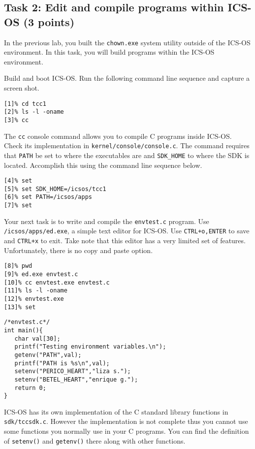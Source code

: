 \documentclass[a4paper, 11pt,oneside]{article}
\begin{document}
\subsection*{Task 2: Edit and compile programs within ICS-OS (3 points)}
In the previous lab, you built the \texttt{chown.exe} system utility outside 
of the ICS-OS environment. In this task, you will build programs within the 
ICS-OS environment.

Build and boot ICS-OS. Run the following command line sequence and capture a screen shot.	

\begin{verbatim}
[1]% cd tcc1
[2]% ls -l -oname
[3]% cc
\end{verbatim}

The \texttt{cc} console command allows you to compile C programs inside ICS-OS. Check its implementation 
in \texttt{kernel/console/console.c}. The command requires that \texttt{PATH} be set to where 
the executables are and \texttt{SDK\_HOME} to where the SDK is located. Accomplish this using the command line sequence below.  

\begin{verbatim}
[4]% set
[5]% set SDK_HOME=/icsos/tcc1
[6]% set PATH=/icsos/apps
[7]% set
\end{verbatim}

Your next task is to write and compile the \texttt{envtest.c} program. Use \texttt{/icsos/apps/ed.exe}, a simple text editor for ICS-OS. Use \texttt{CTRL+o,ENTER} to save and \texttt{CTRL+x} to exit. Take note that this editor has a very limited set of features. Unfortunately, there is no copy and paste option.

\begin{verbatim}
[8]% pwd
[9]% ed.exe envtest.c  
[10]% cc envtest.exe envtest.c
[11]% ls -l -oname
[12]% envtest.exe
[13]% set
\end{verbatim}

\begin{verbatim}
/*envtest.c*/
int main(){
   char val[30];
   printf("Testing environment variables.\n");
   getenv("PATH",val);
   printf("PATH is %s\n",val);
   setenv("PERICO_HEART","liza s.");
   setenv("BETEL_HEART","enrique g.");
   return 0;
}
\end{verbatim}

ICS-OS has its own implementation of the C standard library functions in \texttt{sdk/tccsdk.c}.
However the implementation is not complete thus you cannot use some functions you normally 
use in your C programs.
You can find the definition of \texttt{setenv()} and \texttt{getenv()} there along with other functions. 
\end{document}
